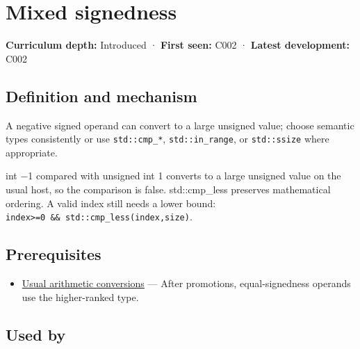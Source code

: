 \hypertarget{appendix-736a2345de4a}{}\label{referencestart:appendix-736a2345de4a}
\section{Mixed signedness}\label{appendix-736a2345de4a-mixed-signedness}

\hypertarget{appendix-736a2345de4a-mixed-signedness}{}

\textbf{Curriculum depth:} Introduced · \textbf{First seen:} C002 · \textbf{Latest development:} C002

\begin{allmightroledefinition}

\subsection{Definition and mechanism}\label{appendix-736a2345de4a-definition-and-mechanism}

\hypertarget{appendix-736a2345de4a-definition-and-mechanism}{}

A negative signed operand can convert to a large unsigned value; choose semantic types consistently or use \texttt{std::cmp\_*}, \texttt{std::in\_range}, or \texttt{std::ssize} where appropriate.

\end{allmightroledefinition}

int −1 compared with unsigned int 1 converts to a large unsigned value on the usual host, so the comparison is false. std::cmp\_less preserves mathematical ordering. A valid index still needs a lower bound: \texttt{index\textgreater{}=0\ \&\&\ std::cmp\_less(index,size)}.

\subsection{Prerequisites}\label{appendix-736a2345de4a-prerequisites}

\hypertarget{appendix-736a2345de4a-prerequisites}{}

\begin{itemize}
\tightlist
\item
  \hyperref[appendix-5e2d663adf7f]{Usual arithmetic conversions} --- After promotions, equal-signedness operands use the higher-ranked type.
\end{itemize}

\subsection{Used by}\label{appendix-736a2345de4a-used-by}

